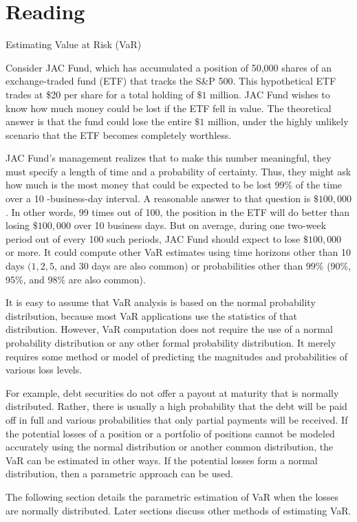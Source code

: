 \documentclass[11pt]{article}
\begin{document}
\section*{Reading}
Estimating Value at Risk (VaR)

Consider JAC Fund, which has accumulated a position of 50,000 shares of an exchange-traded fund (ETF) that tracks the S\&P 500. This hypothetical ETF trades at \$20 per share for a total holding of $\$ 1$ million. JAC Fund wishes to know how much money could be lost if the ETF fell in value. The theoretical answer is that the fund could lose the entire $\$ 1$ million, under the highly unlikely scenario that the ETF becomes completely worthless.

JAC Fund's management realizes that to make this number meaningful, they must specify a length of time and a probability of certainty. Thus, they might ask how much is the most money that could be expected to be lost $99 \%$ of the time over a 10 -business-day interval. A reasonable answer to that question is $\$ 100,000$. In other words, 99 times out of 100, the position in the ETF will do better than losing $\$ 100,000$ over 10 business days. But on average, during one two-week period out of every 100 such periods, JAC Fund should expect to lose $\$ 100,000$ or more. It could compute other VaR estimates using time horizons other than 10 days $(1,2,5$, and 30 days are also common) or probabilities other than $99 \%$ (90\%, 95\%, and $98 \%$ are also common).

It is easy to assume that VaR analysis is based on the normal probability distribution, because most VaR applications use the statistics of that distribution. However, VaR computation does not require the use of a normal probability distribution or any other formal probability distribution. It merely requires some method or model of predicting the magnitudes and probabilities of various loss levels.

For example, debt securities do not offer a payout at maturity that is normally distributed. Rather, there is usually a high probability that the debt will be paid off in full and various probabilities that only partial payments will be received. If the potential losses of a position or a portfolio of positions cannot be modeled accurately using the normal distribution or another common distribution, the VaR can be estimated in other ways. If the potential losses form a normal distribution, then a parametric approach can be used.

The following section details the parametric estimation of VaR when the losses are normally distributed. Later sections discuss other methods of estimating VaR.
\end{document}
